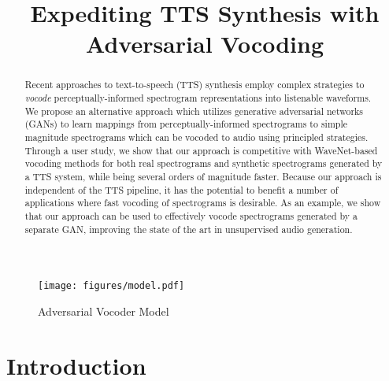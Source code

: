 \documentclass[a4paper]{article}
\title{Expediting TTS Synthesis with Adversarial Vocoding}
\begin{document}
\maketitle
% 
\begin{abstract}
Recent approaches to text-to-speech (TTS) synthesis employ complex strategies to \emph{vocode} perceptually-informed spectrogram representations into listenable waveforms. 
We propose an alternative approach which utilizes generative adversarial networks (GANs) to learn mappings from perceptually-informed spectrograms to simple magnitude spectrograms which can be vocoded to audio using
principled strategies. 
Through a user study, we show that our approach is competitive with WaveNet-based vocoding methods for both real spectrograms and synthetic spectrograms generated by a TTS system, while being several orders of magnitude faster. 
Because our approach is independent of the TTS pipeline, it has the potential to benefit a number of applications where fast vocoding of spectrograms is desirable. 
As an example, we show that our approach can be used to effectively vocode spectrograms generated by a separate GAN, improving the state of the art in unsupervised audio generation.
\end{abstract}


\begin{figure*}[htp]
    \centering
    \texttt{[image: figures/model.pdf]}
    \caption{Adversarial Vocoder Model}
    \label{fig:model}
\end{figure*}


\section{Introduction}
\end{document}
